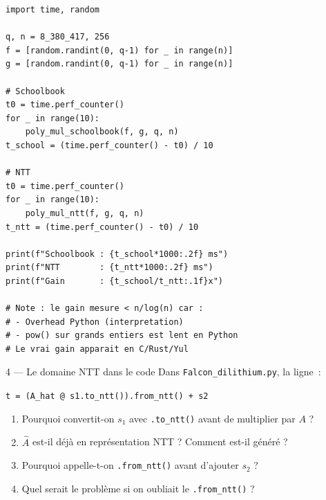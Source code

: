 \documentclass[12pt, a4paper]{article}
\begin{document}
\begin{solution}
\begin{lstlisting}[style=python]
import time, random

q, n = 8_380_417, 256
f = [random.randint(0, q-1) for _ in range(n)]
g = [random.randint(0, q-1) for _ in range(n)]

# Schoolbook
t0 = time.perf_counter()
for _ in range(10):
    poly_mul_schoolbook(f, g, q, n)
t_school = (time.perf_counter() - t0) / 10

# NTT
t0 = time.perf_counter()
for _ in range(10):
    poly_mul_ntt(f, g, q, n)
t_ntt = (time.perf_counter() - t0) / 10

print(f"Schoolbook : {t_school*1000:.2f} ms")
print(f"NTT        : {t_ntt*1000:.2f} ms")
print(f"Gain       : {t_school/t_ntt:.1f}x")

# Note : le gain mesure < n/log(n) car :
# - Overhead Python (interpretation)
# - pow() sur grands entiers est lent en Python
# Le vrai gain apparait en C/Rust/Yul
\end{lstlisting}
\end{solution}

\begin{exercice}{4 --- Le domaine NTT dans le code}
Dans \texttt{Falcon\_dilithium.py}, la ligne~:
\begin{center}
\texttt{t = (A\_hat @ s1.to\_ntt()).from\_ntt() + s2}
\end{center}
\begin{enumerate}[label=\alph*)]
  \item Pourquoi convertit-on $s_1$ avec \texttt{.to\_ntt()} avant de multiplier par $A$ ?
  \item $\hat{A}$ est-il déjà en représentation NTT ? Comment est-il généré ?
  \item Pourquoi appelle-t-on \texttt{.from\_ntt()} avant d'ajouter $s_2$ ?
  \item Quel serait le problème si on oubliait le \texttt{.from\_ntt()} ?
\end{enumerate}
\end{exercice}
\end{document}

